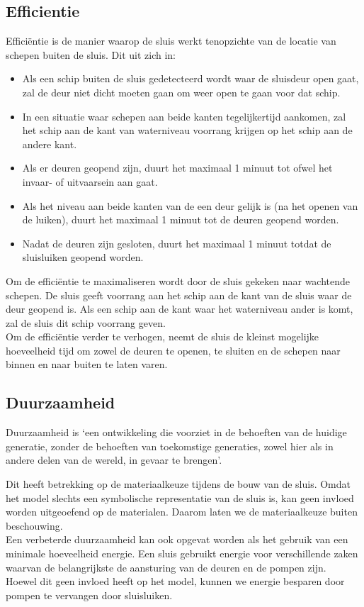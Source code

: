 \documentclass{article} %
\begin{document}
\subsection{Efficientie}
Efficiëntie is de manier waarop de sluis werkt tenopzichte van de locatie van schepen buiten de sluis. Dit uit zich in:
\begin{itemize}
    \item Als een schip buiten de sluis gedetecteerd wordt waar de sluisdeur open gaat, zal de deur niet dicht moeten gaan om weer open te gaan voor dat schip.
    \item In een situatie waar schepen aan beide kanten tegelijkertijd aankomen, zal het schip aan de kant van waterniveau voorrang krijgen op het schip aan de andere kant.
    \item Als er deuren geopend zijn, duurt het maximaal 1 minuut tot ofwel het invaar- of uitvaarsein aan gaat.
    \item Als het niveau aan beide kanten van de een deur gelijk is (na het openen van de luiken), duurt het maximaal 1 minuut tot de deuren geopend worden.
    \item Nadat de deuren zijn gesloten, duurt het maximaal 1 minuut totdat de sluisluiken geopend worden.

\end{itemize}

Om de efficiëntie te maximaliseren wordt door de sluis gekeken naar wachtende schepen. De sluis geeft voorrang aan het schip aan de kant van de sluis waar de deur geopend is. Als een schip aan de kant waar het waterniveau ander is komt, zal de sluis dit schip voorrang geven. \\
Om de efficiëntie verder te verhogen, neemt de sluis de kleinst mogelijke hoeveelheid tijd om zowel de deuren te openen, te sluiten en de schepen naar binnen en naar buiten te laten varen.

\newpage

\subsection{Duurzaamheid} \label{paragraaf 2.3}
Duurzaamheid is ‘een ontwikkeling die voorziet in de behoeften van de huidige generatie, zonder de behoeften van toekomstige generaties, zowel hier als in andere delen van de wereld, in gevaar te brengen’. \cite{CBSduurzaamheid} \par

Dit heeft betrekking op de materiaalkeuze tijdens de bouw van de sluis. Omdat het model slechts een symbolische representatie van de sluis is, kan geen invloed worden uitgeoefend op de materialen. Daarom laten we de materiaalkeuze buiten beschouwing. \\
Een verbeterde duurzaamheid kan ook opgevat worden als het gebruik van een minimale hoeveelheid energie. Een sluis gebruikt energie voor verschillende zaken waarvan de belangrijkste de aansturing van de deuren en de pompen zijn. \\
Hoewel dit geen invloed heeft op het model, kunnen we energie besparen door pompen te vervangen door sluisluiken.
\newpage
\end{document}
